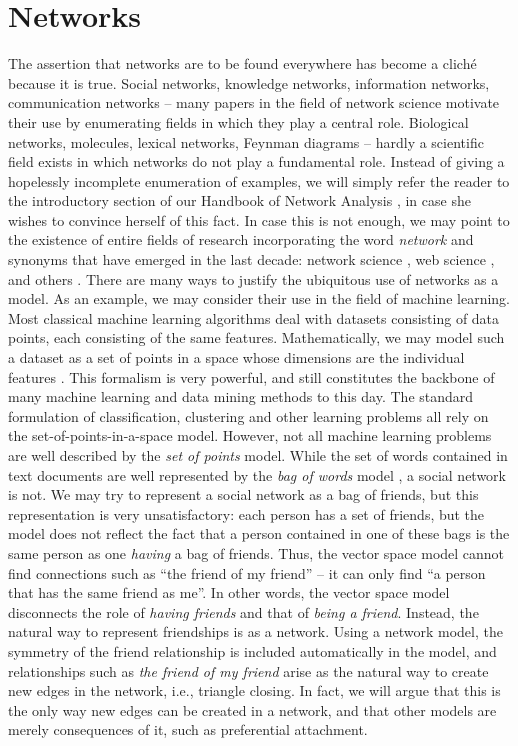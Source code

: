 \documentclass{jimis-final-en}
\begin{document}
\section{Networks}
The assertion that networks are to be found everywhere has become a cliché because
it is true.  Social networks, knowledge networks, information networks,
communication networks -- many papers in the field of network science
motivate their use by enumerating fields in which they play a central
role.  Biological networks, molecules, lexical networks, Feynman
diagrams -- hardly a scientific field exists in which networks do not play
a fundamental role.  Instead of giving a hopelessly incomplete
enumeration of examples, we will simply refer the reader to the
introductory section of our Handbook of Network Analysis
\citep{konect:handbook}, in case she wishes to convince herself of
this fact.  In case this is not enough, we may point to the existence of entire
fields of research incorporating the word \emph{network} and synonyms that have emerged
in the last decade: network science \citep{network-science,newman2010networks}, web science
\citep{web-science}, and others \citep{tiropanis2015}.
There are many ways to justify the ubiquitous use of networks as a
model.  As an example, we may consider their use in the field of machine
learning. 
Most classical machine learning algorithms deal with
datasets consisting of data points, each consisting of the same
features.  Mathematically, we may model such a dataset as a set of
points in a space whose dimensions are the individual features \citep{vector-space-model}.
This formalism is very powerful, and still constitutes the backbone of many
machine learning and data mining methods to this day.  The standard
formulation of classification, clustering and other learning problems
all rely on the set-of-points-in-a-space model. However, not all machine
learning problems are well described by the \emph{set of points} model.
While the set of words contained in text documents are well represented
by the \emph{bag of words} model \citep{b359}, a social network is not.  We may try to
represent a social network as a bag of friends, but this
representation is very unsatisfactory:  each person has a set of
friends, but the model does not reflect the fact that a person
contained in one of these bags is the same person as one
\emph{having} a bag of friends.  Thus, the vector space model cannot
find connections such as ``the friend of my friend'' -- it can only find
``a person that has the same friend as me''.  In other words, the vector
space model disconnects the role of \emph{having friends} and that of
\emph{being a friend}.  Instead, the natural way to represent
friendships is as a network.  Using a network model, the symmetry of the
friend relationship is included automatically in the model, and
relationships such as \emph{the friend of my friend} arise as the
natural way to create new edges in the network, i.e., triangle closing.
In fact, we will argue that this is the only way new edges can be created in a network, and
that other models are merely consequences of it, such as preferential
attachment. 
\end{document}

